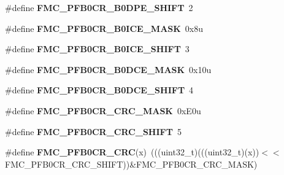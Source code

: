 \begin{DoxyCompactItemize}
\item 
\#define {\bfseries F\+M\+C\+\_\+\+P\+F\+B0\+C\+R\+\_\+\+B0\+D\+P\+E\+\_\+\+S\+H\+I\+FT}~2\hypertarget{group__FMC__Register__Masks_gabe5b35383e6d2198f45bc66429b0ce61}{}\label{group__FMC__Register__Masks_gabe5b35383e6d2198f45bc66429b0ce61}

\item 
\#define {\bfseries F\+M\+C\+\_\+\+P\+F\+B0\+C\+R\+\_\+\+B0\+I\+C\+E\+\_\+\+M\+A\+SK}~0x8u\hypertarget{group__FMC__Register__Masks_ga093ec774220ef7557784c2cea999502e}{}\label{group__FMC__Register__Masks_ga093ec774220ef7557784c2cea999502e}

\item 
\#define {\bfseries F\+M\+C\+\_\+\+P\+F\+B0\+C\+R\+\_\+\+B0\+I\+C\+E\+\_\+\+S\+H\+I\+FT}~3\hypertarget{group__FMC__Register__Masks_ga7595313d5ea6aa0ddb4fa755bad06110}{}\label{group__FMC__Register__Masks_ga7595313d5ea6aa0ddb4fa755bad06110}

\item 
\#define {\bfseries F\+M\+C\+\_\+\+P\+F\+B0\+C\+R\+\_\+\+B0\+D\+C\+E\+\_\+\+M\+A\+SK}~0x10u\hypertarget{group__FMC__Register__Masks_ga2ef77cab94225466d9301d03fc02b432}{}\label{group__FMC__Register__Masks_ga2ef77cab94225466d9301d03fc02b432}

\item 
\#define {\bfseries F\+M\+C\+\_\+\+P\+F\+B0\+C\+R\+\_\+\+B0\+D\+C\+E\+\_\+\+S\+H\+I\+FT}~4\hypertarget{group__FMC__Register__Masks_gaf25cde827cdccda0268d84a381fb8ab2}{}\label{group__FMC__Register__Masks_gaf25cde827cdccda0268d84a381fb8ab2}

\item 
\#define {\bfseries F\+M\+C\+\_\+\+P\+F\+B0\+C\+R\+\_\+\+C\+R\+C\+\_\+\+M\+A\+SK}~0x\+E0u\hypertarget{group__FMC__Register__Masks_ga2ba15c609c4ff7e43ed4d6119b704ddd}{}\label{group__FMC__Register__Masks_ga2ba15c609c4ff7e43ed4d6119b704ddd}

\item 
\#define {\bfseries F\+M\+C\+\_\+\+P\+F\+B0\+C\+R\+\_\+\+C\+R\+C\+\_\+\+S\+H\+I\+FT}~5\hypertarget{group__FMC__Register__Masks_ga45e4e9c3fff1241f2d1fffa05825efc8}{}\label{group__FMC__Register__Masks_ga45e4e9c3fff1241f2d1fffa05825efc8}

\item 
\#define {\bfseries F\+M\+C\+\_\+\+P\+F\+B0\+C\+R\+\_\+\+C\+RC}(x)~(((uint32\+\_\+t)(((uint32\+\_\+t)(x))$<$$<$F\+M\+C\+\_\+\+P\+F\+B0\+C\+R\+\_\+\+C\+R\+C\+\_\+\+S\+H\+I\+FT))\&F\+M\+C\+\_\+\+P\+F\+B0\+C\+R\+\_\+\+C\+R\+C\+\_\+\+M\+A\+SK)\hypertarget{group__FMC__Register__Masks_gadcd46a402d7624898e087fc4bb20c38d}{}\label{group__FMC__Register__Masks_gadcd46a402d7624898e087fc4bb20c38d}


\end{DoxyCompactItemize}
